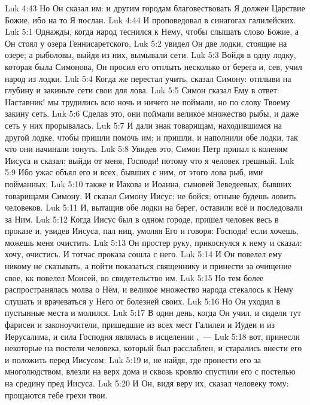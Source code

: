 \vs Luk 4:43 Но Он сказал им: и другим городам благовествовать Я должен Царствие Божие, ибо на то Я послан.
\vs Luk 4:44 И проповедовал в синагогах галилейских.
\vs Luk 5:1 Однажды, когда народ теснился к Нему, чтобы слышать слово Божие, а Он стоял у озера Геннисаретского,
\vs Luk 5:2 увидел Он две лодки, стоящие на озере; а рыболовы, выйдя из них, вымывали сети.
\vs Luk 5:3 Войдя в одну лодку, которая была Симонова, Он просил его отплыть несколько от берега и, сев, учил народ из лодки.
\vs Luk 5:4 Когда же перестал учить, сказал Симону: отплыви на глубину и закиньте сети свои для лова.
\vs Luk 5:5 Симон сказал Ему в ответ: Наставник! мы трудились всю ночь и ничего не поймали, но по слову Твоему закину сеть.
\vs Luk 5:6 Сделав это, они поймали великое множество рыбы, и даже сеть у них прорывалась.
\vs Luk 5:7 И дали знак товарищам, находившимся на другой лодке, чтобы пришли помочь им; и пришли, и наполнили обе лодки, так что они начинали тонуть.
\vs Luk 5:8 Увидев это, Симон Петр припал к коленям Иисуса и сказал: выйди от меня, Господи! потому что я человек грешный.
\vs Luk 5:9 Ибо ужас объял его и всех, бывших с ним, от этого лова рыб, ими пойманных;
\vs Luk 5:10 также и Иакова и Иоанна, сыновей Зеведеевых, бывших товарищами Симону. И сказал Симону Иисус: не бойся; отныне будешь ловить человеков.
\vs Luk 5:11 И, вытащив обе лодки на берег, оставили всё и последовали за Ним.
\rsbpar\vs Luk 5:12 Когда Иисус был в одном городе, пришел человек весь в проказе и, увидев Иисуса, пал ниц, умоляя Его и говоря: Господи! если хочешь, можешь меня очистить.
\vs Luk 5:13 Он простер руку, прикоснулся к нему и сказал: хочу, очистись. И тотчас проказа сошла с него.
\vs Luk 5:14 И Он повелел ему никому не сказывать, а пойти показаться священнику и принести  за очищение свое, кк повелел Моисей, во свидетельство им.
\vs Luk 5:15 Но тем более распространялась молва о Нём, и великое множество народа стекалось к Нему слушать и врачеваться у Него от болезней своих.
\vs Luk 5:16 Но Он уходил в пустынные места и молился.
\rsbpar\vs Luk 5:17 В один день, когда Он учил, и сидели тут фарисеи и законоучители, пришедшие из всех мест Галилеи и Иудеи и из Иерусалима, и сила Господня являлась в исцелении ,~---
\vs Luk 5:18 вот, принесли некоторые на постели человека, который был расслаблен, и старались внести его  и положить перед Иисусом;
\vs Luk 5:19 и, не найдя, где пронести его за многолюдством, влезли на верх дома и сквозь кровлю спустили его с постелью на средину пред Иисуса.
\vs Luk 5:20 И Он, видя веру их, сказал человеку тому: прощаются тебе грехи твои.
